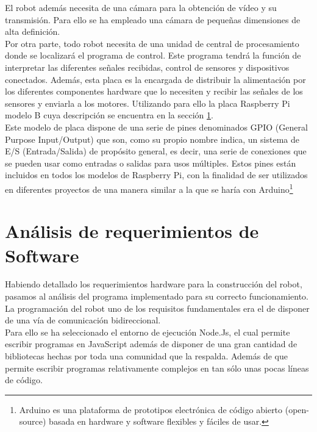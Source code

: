 El robot además necesita de una cámara para la obtención de vídeo y su transmisión. Para ello se ha empleado una cámara de pequeñas dimensiones de alta definición.\\

Por otra parte, todo robot necesita de una unidad de central de procesamiento donde se localizará el programa de control. Este programa tendrá la función de interpretar las diferentes señales recibidas,
control de sensores y dispositivos conectados. Además, esta placa es la encargada de distribuir la alimentación por los diferentes componentes hardware que lo necesiten y recibir las señales de
los sensores y enviarla a los motores. Utilizando para ello la placa Raspberry Pi modelo B cuya descripción se encuentra en la sección \ref{}.\\

Este modelo de placa dispone de  una serie de pines denominados GPIO (General Purpose Input/Output) que son, como su propio nombre indica, un sistema de E/S (Entrada/Salida) de propósito general,
es decir, una serie de conexiones que se pueden usar como entradas o salidas para usos múltiples. Estos pines están incluidos en todos los modelos de Raspberry Pi, con la
finalidad de ser utilizados en diferentes proyectos de una manera similar a la que se haría con Arduino\footnote{Arduino es una plataforma de prototipos electrónica de código abierto (open-source) 
basada en hardware y software flexibles y fáciles de usar.}

\section{Análisis de requerimientos de Software}

Habiendo detallado los requerimientos hardware para la construcción del robot, pasamos al análisis del programa implementado para su correcto funcionamiento.\\

La programación del robot uno de los requisitos fundamentales era el de disponer de una vía de comunicación bidireccional.\\

Para ello se ha seleccionado el entorno de ejecución Node.Js, el cual permite escribir programas en JavaScript además de disponer de una gran cantidad de bibliotecas hechas por toda una comunidad que la respalda.
Además de que permite escribir programas relativamente complejos en tan sólo unas pocas líneas de código.\\

